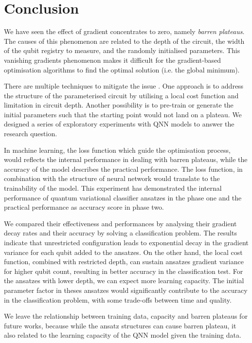 \section{Conclusion}
We have seen the effect of gradient concentrates to zero, namely \emph{barren plateaus}.
The causes of this phenomenon are related to the depth of the circuit, the width of the qubit registry to measure, and the randomly initialised parameters.
This vanishing gradients phenomenon makes it difficult for the gradient-based optimisation algorithms to find the optimal solution (i.e. the global minimum).

There are multiple techniques to mitigate the issue \cite{cerezoCostFunctionDependent2021, skolikLayerwiseLearningQuantum2021, grantInitializationStrategyAddressing2019}.
One approach is to address the structure of the parameterised circuit by utilising a local cost function and limitation in circuit depth.
Another possibility is to pre-train or generate the initial parameters such that the starting point would not land on a plateau.
We designed a series of exploratory experiments with QNN models to answer the research question.

In machine learning, the loss function which guide the optimisation process, would reflects the internal performance in dealing with barren plateaus, while the accuracy of the model describes the practical performance.
The loss function, in combination with the structure of neural network would translate to the trainability of the model.
This experiment has demonstrated the internal performance of quantum variational classifier ansatzes in the phase one and the practical performance as accuracy score in phase two.

We compared their effectiveness and performances by analysing their gradient decay rates and their accuracy by solving a classification problem.
The results indicate that unrestricted configuration leads to exponential decay in the gradient variance for each qubit added to the ansatzes.
On the other hand, the local cost function, combined with restricted depth, can sustain ansatzes gradient variance for higher qubit count, resulting in better accuracy in the classification test.
For the ansatzes with lower depth, we can expect more learning capacity.
The initial parameter factor in theses ansatzes would significantly contribute to the accuracy in the classification problem, with some trade-offs between time and quality.

We leave the relationship between training data, capacity and barren plateaus for future works, because while the ansatz structures can cause barren plateau, it also related to the learning capacity of the QNN model given the training data.
